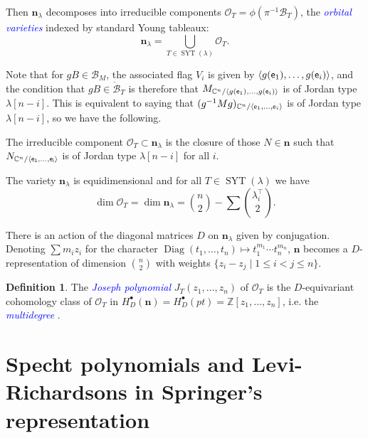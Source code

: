 \documentclass[11pt]{amsart}
\theoremstyle{definition}
\newtheorem{defn}[thm]{Definition}
\numberwithin{equation}{section}
\newcommand{\ar}[1]
{{\xrightarrow{#1}}}
\newcommand{\suchthat}{\;|\;}
\newcommand{\GL}{\mathrm{GL}}
\renewcommand\emph[1]{\textcolor{blue}{\textit{#1}}} %
\newcommand{\syt}{\operatorname{SYT}} %
\begin{document}
\begin{center}
\end{center}
Then $\bm{n}_{\lambda}$ decomposes into irreducible components $\mathcal{O}_T=\phi(\pi^{-1}\mathcal{B}_T)$, the \emph{orbital varieties} indexed by standard Young tableaux: $$\bm{n}_{\lambda}=\bigcup_{T\in \syt(\lambda)}\mathcal{O}_T.$$

Note that for $gB\in \mathcal{B}_M$, the associated flag $V_i$ is given by $\langle g({\sf  e}_1),\ldots,g({\sf e}_i)\rangle$, and the condition that $gB\in \mathring{\mathcal{B}}_T$ is therefore that $M_{\mathbb{C}^n/\langle g({\sf e}_1),\ldots,g({\sf e}_i)\rangle}$ is of Jordan type $\lambda[n-i]$.
This is equivalent to saying that $(g^{-1}Mg)_{\mathbb{C}^n/\langle {\sf e}_1,\ldots,{\sf e}_i\rangle}$ is of Jordan type $\lambda[n-i]$, so we have the following.
\begin{fact}
    The irreducible component $\mathcal{O}_T\subset \bm{n}_\lambda$ is the closure of those $N\in \bm{n}$ such that $N_{\mathbb{C}^n/\langle \sf{e}_1,\ldots,\sf{e}_i\rangle}$ is of Jordan type $\lambda[n-i]$ for all $i$.
\end{fact}

The variety $\bm{n}_\lambda$ is equidimensional and for all $T\in \syt(\lambda)$ we have \cite[Section 3.1]{Jo84}
$$\dim \mathcal{O}_T=\dim \bm{n}_{\lambda}=\binom{n}{2}-\sum \binom{\lambda_i^{\top}}{2}.$$

There is an action of the diagonal matrices $D$ on $\bm{n}_\lambda$ given by conjugation. Denoting $\sum m_iz_i$ for the character $\operatorname{Diag}(t_1,\ldots,t_n)\mapsto t_1^{m_1}\cdots t_n^{m_n}$, $\bm{n}$ becomes a $D$-representation of dimension $\binom{n}{2}$ with weights $\{z_i-z_j\suchthat 1\le i< j \le n\}$.
\begin{defn}
    The \emph{Joseph polynomial} \cite{Jo84,Jo89,KZJ14,RTVZJ12} $J_T(z_1,\ldots,z_n)$ of $\mathcal{O}_T$ is the $D$-equivariant cohomology class of $\mathcal{O}_T$ in $H^\bullet_D(\bm{n})=H^\bullet_D(pt)=\mathbb{Z}[z_1,\ldots,z_n]$, i.e. the \emph{multidegree} \cite{MiSt05}.
\end{defn}

\section{Specht polynomials and Levi-Richardsons in Springer's representation}
\label{sec:SpringerRepRichardson}
\end{document}
